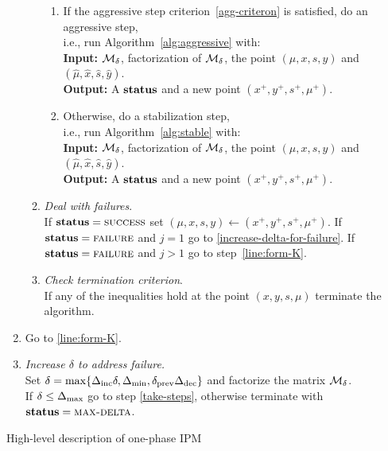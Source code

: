 \documentclass{article}
\begin{document}
\begin{algorithm}[H]
\begin{enumerate}[label*=A.{\arabic*}]
\begin{enumerate}[label*=.{\arabic*}]
\begin{enumerate}[label=-Case {\Roman*}]
\item If the aggressive step criterion~\eqref{agg-criteron} is satisfied, do an aggressive step, \\
i.e., run Algorithm~\ref{alg:aggressive} with: \\
\hspace*{0.1cm}  \textbf{Input:} $\mathcal{M}_{\delta}$, factorization of $\mathcal{M}_{\delta}$, the point $(\mu, x, s, y)$ and $(\hat{\mu}, \hat{x}, \hat{s}, \hat{y})$. \\
\hspace*{0.1cm}  \textbf{Output:} A $\textbf{status}$ and a new point $(x^{+},y^{+},s^{+}, \mu^{+})$.
\item Otherwise, do a stabilization step, \\
i.e., run Algorithm~\ref{alg:stable} with: \\
\hspace*{0.1cm} \textbf{Input:} $\mathcal{M}_{\delta}$, factorization of $\mathcal{M}_{\delta}$, the point $(\mu, x, s, y)$ and $(\hat{\mu}, \hat{x}, \hat{s}, \hat{y})$. \\
\hspace*{0.1cm} \textbf{Output:} A $\textbf{status}$ and a new point $(x^{+},y^{+},s^{+}, \mu^{+})$.
\end{enumerate}
\item \emph{Deal with failures}. \\
If $\textbf{status} = \textsc{success}$ set $(\mu, x, s, y) \gets (x^{+},y^{+},s^{+}, \mu^{+})$. If $\textbf{status} = \textsc{failure}$ and $j = 1$ go to \eqref{increase-delta-for-failure}.  If $\textbf{status} = \textsc{failure}$ and $j > 1$ go to step~\eqref{line:form-K}.
\item \emph{Check termination criterion}. \\
If any of the inequalities \termination{} hold at the point $(x,y,s,\mu)$ terminate the algorithm.
\end{enumerate}
\item 
Go to \eqref{line:form-K}.
\item \label{increase-delta-for-failure} \emph{Increase $\delta$ to address failure.} \\
Set $\delta = \max\{\Delta_{\text{inc}} \delta, \Delta_{\min}, \delta_{\text{prev}} \Delta_{\text{dec}} \}$ and factorize the matrix $\mathcal{M}_{\delta}$. \\
If $\delta \le \Delta_{\max}$ go to step \eqref{take-steps}, otherwise terminate with $\textbf{status} = \textsc{max-delta}$.
\end{enumerate}
\caption{High-level description of one-phase IPM}\label{one-phase-IPM}
\end{algorithm}
\end{document}
